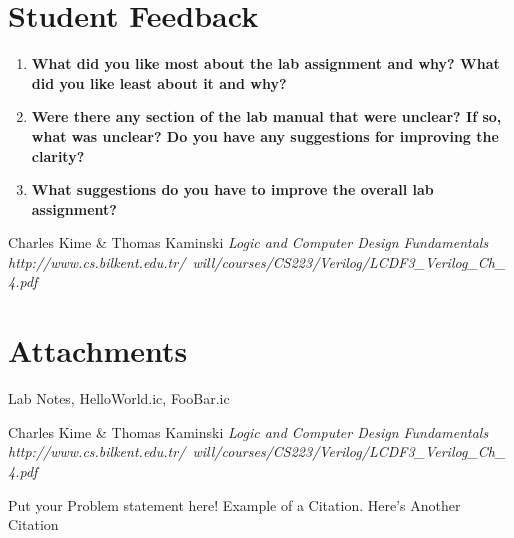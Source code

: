 \documentclass[a4paper,12pt]{article}
\begin{document}
\section*{Student Feedback}

\begin{enumerate}
  \item \textbf{What did you like most about the lab assignment and why? What did you like least about it and why?}
  \vspace{10pt}

  \item \textbf{Were there any section of the lab manual that were unclear? If so, what was unclear? Do you have any suggestions for improving the clarity?}
  \vspace{10pt}

  \item \textbf{What suggestions do you have to improve the overall lab assignment?}
  \vspace{10pt}

\end{enumerate}

\ifx
\begin{thebibliography}{1}
 Charles Kime \& Thomas Kaminski  \emph{Logic and Computer Design Fundamentals} \\ \hspace{15pt}\textit{http://www.cs.bilkent.edu.tr/~will/courses/CS223/Verilog/LCDF3_Verilog_Ch_4.pdf}
\end{thebibliography}

\section*{Attachments}
Lab Notes, HelloWorld.ic, FooBar.ic

\begin{thebibliography}{9}
 Charles Kime & Thomas Kaminski  \emph{Logic and Computer Design Fundamentals} \textit{http://www.cs.bilkent.edu.tr/~will/courses/CS223/Verilog/LCDF3_Verilog_Ch_4.pdf}
\end{thebibliography}

Put your Problem statement here! Example of a Citation\cite[p.219]{Robotics}. Here's Another Citation\cite{Flueck}
\fi
\end{document}
